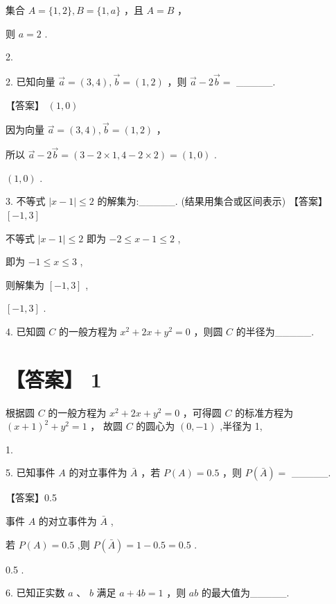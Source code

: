 \documentclass[10pt]{article}
\begin{document}
集合 \(A = \{ 1,2\} ,B = \{ 1,a\}\) ，且 \(A = B\) ，

则 \(a = 2\) .

2.

2. 已知向量 \(\overrightarrow{a} = \left( {3,4}\right) ,\overrightarrow{b} = \left( {1,2}\right)\) ，则 \(\overrightarrow{a} - 2\overrightarrow{b} =\) \_\_\_\_\_.

【答案】 \(\left( {1,0}\right)\)

因为向量 \(\overrightarrow{a} = \left( {3,4}\right) ,\overrightarrow{b} = \left( {1,2}\right)\) ，

所以 \(\overrightarrow{a} - 2\overrightarrow{b} = \left( {3 - 2 \times  1,4 - 2 \times  2}\right)  = \left( {1,0}\right)\) .

\(\left( {1,0}\right)\) .

3. 不等式 \(\left| {x - 1}\right|  \leq  2\) 的解集为:\_\_\_\_\_. (结果用集合或区间表示) 【答案】 \(\left\lbrack  {-1,3}\right\rbrack\)

不等式 \(\left| {x - 1}\right|  \leq  2\) 即为 \(- 2 \leq  x - 1 \leq  2\) ,

即为 \(- 1 \leq  x \leq  3\) ,

则解集为 \(\left\lbrack  {-1,3}\right\rbrack\) ,

\(\left\lbrack  {-1,3}\right\rbrack\) .

4. 已知圆 \(C\) 的一般方程为 \({x}^{2} + {2x} + {y}^{2} = 0\) ，则圆 \(C\) 的半径为\_\_\_\_\_.

\section*{【答案】 1}

根据圆 \(C\) 的一般方程为 \({x}^{2} + {2x} + {y}^{2} = 0\) ，可得圆 \(C\) 的标准方程为 \({\left( x + 1\right) }^{2} + {y}^{2} = 1\) ， 故圆 \(C\) 的圆心为 \(\left( {0, - 1}\right)\) ,半径为 1,

1.

5. 已知事件 \(A\) 的对立事件为 \(\bar{A}\) ，若 \(P\left( A\right)  = {0.5}\) ，则 \(P\left( \bar{A}\right)  =\) \_\_\_\_\_.

【答案】0.5

事件 \(A\) 的对立事件为 \(\bar{A}\) ,

若 \(P\left( A\right)  = {0.5}\) ,则 \(P\left( \bar{A}\right)  = 1 - {0.5} = {0.5}\) .

0.5 .

6. 已知正实数 \(a\text{ 、 }b\) 满足 \(a + {4b} = 1\) ，则 \({ab}\) 的最大值为\_\_\_\_\_.
\end{document}
